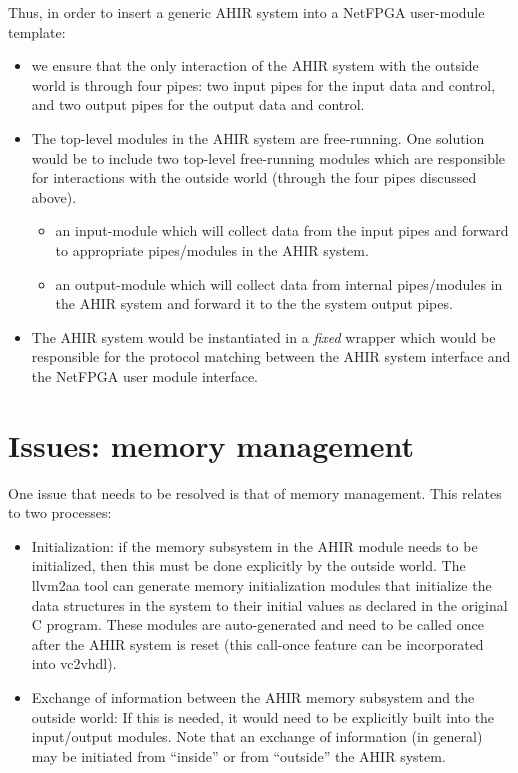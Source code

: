 \documentclass{article}
\begin{document}
Thus, in order to insert a generic AHIR system into a NetFPGA user-module template:
\begin{itemize}
\item we ensure that the only interaction of the AHIR system with the outside world is
through four pipes: two input pipes for the input data and control, and
two output pipes for the output data and control.
\item The top-level modules in the AHIR system are free-running.  One solution
would be to include two top-level free-running modules which are 
responsible for interactions with the outside world (through the four pipes
discussed above).
\begin{itemize}
\item an input-module which will collect data from the input pipes and
forward to appropriate pipes/modules in the AHIR system.
\item an output-module which will collect data from internal pipes/modules
in the AHIR system and forward it to the the system output pipes.
\end{itemize}
\item The AHIR system would be instantiated in a {\em fixed} wrapper
which would be responsible for the protocol matching between the AHIR
system interface and the NetFPGA user module interface.
\end{itemize}


\section{Issues: memory management}

One issue that needs to be resolved is that of memory management.
This relates to two processes:
\begin{itemize}
\item Initialization: if the memory subsystem in the AHIR module needs
to be initialized, then this must be done explicitly by the outside
world.  The llvm2aa tool can generate memory initialization modules
that initialize the data structures in the system to their initial
values as declared in the original C program.  These modules are
auto-generated and need to be called once after the AHIR system
is reset (this call-once feature can be incorporated into vc2vhdl).
\item Exchange of information between the AHIR memory subsystem and
the outside world:  If this is needed, it would need to be explicitly 
built into the input/output modules.  Note that an exchange of
information (in general) may be initiated from ``inside'' or
from ``outside'' the AHIR system.
\end{itemize}
\end{document}
